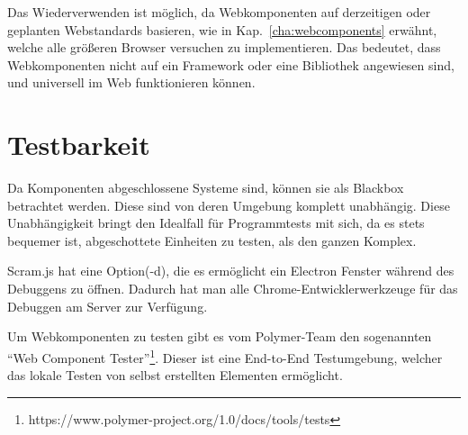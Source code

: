 Das Wiederverwenden ist möglich, da Webkomponenten auf derzeitigen oder geplanten Webstandards basieren, wie in Kap.~\ref{cha:webcomponents} erwähnt, welche alle größeren Browser versuchen zu implementieren. Das bedeutet, dass Webkomponenten nicht auf ein Framework oder eine Bibliothek angewiesen sind, und universell im Web funktionieren können.

\section{Testbarkeit}

Da Komponenten abgeschlossene Systeme sind, können sie als Blackbox betrachtet werden. Diese sind von deren Umgebung komplett unabhängig. Diese Unabhängigkeit bringt den Idealfall für Programmtests mit sich, da es stets bequemer ist, abgeschottete Einheiten zu testen, als den ganzen Komplex.

Scram.js hat eine Option(-d), die es ermöglicht ein Electron Fenster während des Debuggens zu öffnen. Dadurch hat man alle Chrome-Entwicklerwerkzeuge für das Debuggen am Server zur Verfügung.

Um Webkomponenten zu testen gibt es vom Polymer-Team den sogenannten "`Web Component Tester"'\footnote{https://www.polymer-project.org/1.0/docs/tools/tests}. Dieser ist eine End-to-End Testumgebung, welcher das lokale Testen von selbst erstellten Elementen ermöglicht.